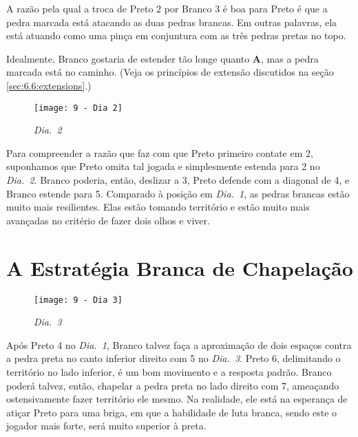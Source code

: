 A razão pela qual a troca de Preto 2 por Branco 3 é boa para Preto é que a pedra marcada está atacando as duas pedras brancas. Em outras palavras, ela está atuando como uma pinça em conjuntura com as três pedras pretas no topo.

Idealmente, Branco gostaria de estender tão longe quanto \textbf{A}, mas a pedra marcada está no caminho. (Veja os princípios de extensão discutidos na seção \autoref{sec:6.6:extensions}.)

\begin{wrapfigure}{l}{60mm}
    \vspace{-25pt}
    \begin{center}
        \texttt{[image: 9 - Dia 2]}
        \captionsetup{justification=centering}
        \caption*{\emph{Dia.\@~2}}
    \end{center}
    \vspace{-30pt}
\end{wrapfigure}

Para compreender a razão que faz com que Preto primeiro contate em 2, suponhamos que Preto omita tal jogada e simplesmente estenda para 2 no \emph{Dia.\@~2}. Branco poderia, então, deslizar a 3, Preto defende com a diagonal de 4, e Branco estende para 5. Comparado à posição em \emph{Dia.\@~1}, as pedras brancas estão muito mais resilientes. Elas estão tomando território e estão muito mais avançadas no critério de fazer dois olhos e viver.

\pagebreak

\section{A Estratégia Branca de Chapelação}

\begin{wrapfigure}{r}{60mm}
    \vspace{-27.5pt}
    \begin{center}
        \texttt{[image: 9 - Dia 3]}
        \captionsetup{justification=centering}
        \caption*{\emph{Dia.\@~3}}
    \end{center}
    \vspace{-30pt}
\end{wrapfigure}

Após Preto 4 no \emph{Dia.\@~1}, Branco talvez faça a aproximação de dois espaços contra a pedra preta no canto inferior direito com 5 no \emph{Dia.\@~3}. Preto 6, delimitando o território no lado inferior, é um bom movimento e a resposta padrão. Branco poderá talvez, então, chapelar a pedra preta no lado direito com 7, ameaçando ostensivamente fazer território ele mesmo. Na realidade, ele está na esperança de atiçar Preto para uma briga, em que a habilidade de luta branca, sendo este o jogador mais forte, será muito superior à preta.

